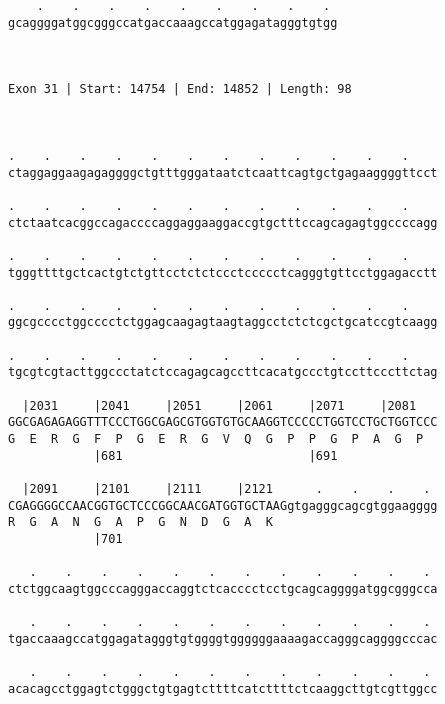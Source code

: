\documentclass{article}
\begin{document}
\begin{Verbatim}
    .    .    .    .    .    .    .    .    . 
gcaggggatggcgggccatgaccaaagccatggagatagggtgtgg
                                              
                                              
 
Exon 31 | Start: 14754 | End: 14852 | Length: 98



.    .    .    .    .    .    .    .    .    .    .    .    
ctaggaggaagagaggggctgtttgggataatctcaattcagtgctgagaaggggttcct
                                                            
.    .    .    .    .    .    .    .    .    .    .    .    
ctctaatcacggccagaccccaggaggaaggaccgtgctttccagcagagtggccccagg
                                                            
.    .    .    .    .    .    .    .    .    .    .    .    
tgggttttgctcactgtctgttcctctctccctccccctcagggtgttcctggagacctt
                                                            
.    .    .    .    .    .    .    .    .    .    .    .    
ggcgcccctggcccctctggagcaagagtaagtaggcctctctcgctgcatccgtcaagg
                                                            
.    .    .    .    .    .    .    .    .    .    .    .    
tgcgtcgtacttggccctatctccagagcagccttcacatgccctgtccttcccttctag
                                                            
  |2031     |2041     |2051     |2061     |2071     |2081   
GGCGAGAGAGGTTTCCCTGGCGAGCGTGGTGTGCAAGGTCCCCCTGGTCCTGCTGGTCCC
G  E  R  G  F  P  G  E  R  G  V  Q  G  P  P  G  P  A  G  P  
            |681                          |691              
  
  |2091     |2101     |2111     |2121      .    .    .    . 
CGAGGGGCCAACGGTGCTCCCGGCAACGATGGTGCTAAGgtgagggcagcgtggaagggg
R  G  A  N  G  A  P  G  N  D  G  A  K                       
            |701                                            
  
   .    .    .    .    .    .    .    .    .    .    .    . 
ctctggcaagtggcccagggaccaggtctcacccctcctgcagcaggggatggcgggcca
                                                            
   .    .    .    .    .    .    .    .    .    .    .    . 
tgaccaaagccatggagatagggtgtggggtggggggaaaagaccagggcaggggcccac
                                                            
   .    .    .    .    .    .    .    .    .    .    .    . 
acacagcctggagtctgggctgtgagtcttttcatcttttctcaaggcttgtcgttggcc
                                                            

\end{Verbatim}
\end{document}

